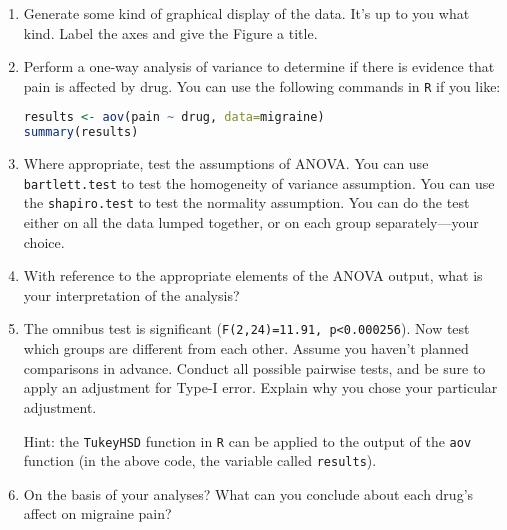 \documentclass[10pt]{article}
\begin{document}
\begin{enumerate}

\item Generate some kind of graphical display of the data. It's up to
  you what kind. Label the axes and give the Figure a title.

\item Perform a one-way analysis of variance to determine if there is
  evidence that pain is affected by drug. You can use the following
  commands in \texttt{R} if you like:

\begin{lstlisting}[language=R]
results <- aov(pain ~ drug, data=migraine)
summary(results)
\end{lstlisting}

\item Where appropriate, test the assumptions of ANOVA. You can use
  \texttt{bartlett.test} to test the homogeneity of variance
  assumption. You can use the \texttt{shapiro.test} to test the
  normality assumption. You can do the test either on all the data
  lumped together, or on each group separately---your choice.

\item With reference to the appropriate elements of the ANOVA output,
  what is your interpretation of the analysis?

\item The omnibus test is significant (\texttt{F(2,24)=11.91,
    p<0.000256}). Now test which groups are different from each
  other. Assume you haven't planned comparisons in advance. Conduct
  all possible pairwise tests, and be sure to apply an adjustment for
  Type-I error. Explain why you chose your particular adjustment.

  Hint: the \texttt{TukeyHSD} function in \texttt{R} can be applied to
  the output of the \texttt{aov} function (in the above code, the
  variable called \texttt{results}).

\item On the basis of your analyses? What can you conclude about each
  drug's affect on migraine pain?

\end{enumerate}
\end{document}
